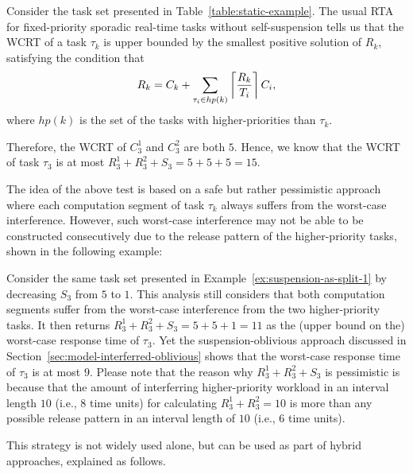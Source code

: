 \begin{example}
\label{ex:suspension-as-split-1}   
Consider the task set presented in Table~\ref{table:static-example}. The usual RTA for fixed-priority sporadic real-time tasks without self-suspension \cite{Liu_1973} tells us that the WCRT of a task $\tau_k$ is upper bounded by the smallest positive solution of $R_k$, satisfying the condition that
  \begin{equation}
   \label{eq:rta}
  R_k = C_k+ \sum_{\tau_i \in hp(k)}\left\lceil{\frac{R_k}{T_i}}\right\rceil C_i,     
  \end{equation}
  where $hp(k)$ is the set of the tasks with higher-priorities
  than $\tau_k$.

Therefore, the WCRT of $C_3^1$ and $C_3^2$ are both $5$. Hence, we know that the WCRT of task $\tau_3$ is at most $R_3^1 + R_3^2 + S_3 = 5 + 5 + 5 = 15$.
\hfill\myendproof  
\end{example}


The idea of the above test is based on a safe but rather pessimistic approach where each computation segment of task $\tau_k$ always suffers from the worst-case interference. However, such worst-case interference may not be able to be constructed consecutively due to the release pattern of the higher-priority tasks, shown in the following example:
\begin{example}
\label{ex:suspension-as-split-2}   
Consider the same task set presented in Example~\ref{ex:suspension-as-split-1} by decreasing $S_3$ from $5$ to $1$. This analysis still considers that both computation segments suffer from the worst-case interference from the two higher-priority tasks. It then returns $R_3^1 + R_3^2 + S_3 = 5 + 5 + 1 =11$ as the (upper bound on the) worst-case response time of $\tau_3$. Yet the suspension-oblivious approach discussed in Section~\ref{sec:model-interferred-oblivious} shows that the worst-case response time of $\tau_3$ is at most $9$. Please note that the reason why $R_3^1 + R_3^2 + S_3$ is pessimistic is because that the amount of interferring higher-priority workload in an interval length $10$ (i.e., 8 time units) for calculating $R_3^1 + R_3^2=10$ is more than any possible release pattern in an interval length of $10$ (i.e., 6 time units).
\hfill\myendproof  
\end{example} 

This strategy is not widely used alone, but can be used as part of hybrid approaches, explained as follows.

